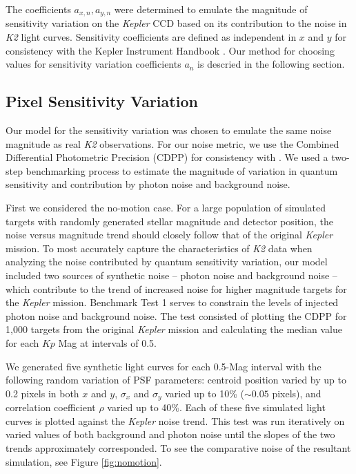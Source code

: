 \documentclass[12pt,preprint]{aastex}
\begin{document}
The coefficients $a_{x,n}, a_{y,n}$ were determined to emulate the magnitude of sensitivity variation on the \textit{Kepler} CCD based on its contribution to the noise in \textit{K2} light curves. Sensitivity coefficients are defined as independent in $x$ and $y$ for consistency with the Kepler Instrument Handbook \citep{kepler_intrument_handbook}. Our method for choosing values for sensitivity variation coefficients $a_n$ is descried in the following section.

\subsection{Pixel Sensitivity Variation}

Our model for the sensitivity variation was chosen to emulate the same noise magnitude as real \textit{K2} observations. For our noise metric, we use the Combined Differential Photometric Precision (CDPP) \citep{10.1086/668847} for consistency with \cite{2016AJ....152..100L}. We used a two-step benchmarking process to estimate the magnitude of variation in quantum sensitivity and contribution by photon noise and background noise.

First we considered the no-motion case. For a large population of simulated targets with randomly generated stellar magnitude and detector position, the noise versus magnitude trend should closely follow that of the original \textit{Kepler} mission. To most accurately capture the characteristics of \textit{K2} data when analyzing the noise contributed by quantum sensitivity variation, our model included two sources of synthetic noise -- photon noise and background noise -- which contribute to the trend of increased noise for higher magnitude targets for the \textit{Kepler} mission. Benchmark Test 1 serves to constrain the levels of injected photon noise and background noise. The test consisted of plotting the CDPP for 1,000 targets from the original \textit{Kepler} mission and calculating the median value for each $Kp$ Mag at intervals of 0.5.

We generated five synthetic light curves for each 0.5-Mag interval with the following random variation of PSF parameters: centroid position varied by up to 0.2 pixels in both $x$ and $y$, $\sigma_x$ and $\sigma_y$ varied up to 10\% (${\sim}0.05$ pixels), and correlation coefficient $\rho$ varied up to 40\%. Each of these five simulated light curves is plotted against the \textit{Kepler} noise trend. This test was run iteratively on varied values of both background and photon noise until the slopes of the two trends approximately corresponded. To see the comparative noise of the resultant simulation, see Figure \ref{fig:nomotion}.
\end{document}
